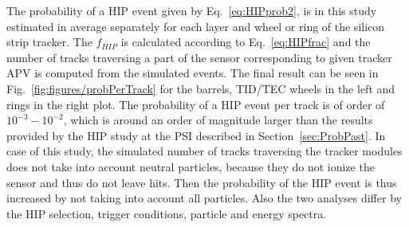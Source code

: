 The probability of a HIP event given by Eq.~\ref{eq:HIPprob2}, is in this study estimated in average separately for each layer and wheel or ring of the silicon strip tracker.  The $f_{HIP}$ is calculated according to Eq.~\ref{eq:HIPfrac} and the number of tracks traversing a part of the sensor corresponding to given tracker APV is computed from the simulated events. The final result can be seen in Fig.~\ref{fig:figures/probPerTrack} for the barrels, TID/TEC wheels in the left and rings in the right plot. The probability of a HIP event per track is of order of $10^{-3}-10^{-2}$, which is around an order of magnitude larger than the results provided by the HIP study at the PSI described in Section~\ref{sec:ProbPast}. In case of this study, the simulated number of tracks traversing the tracker modules does not take into account neutral particles, because they do not ionize the sensor and thus do not leave hits. Then the probability of the HIP event is thus increased by not taking into account all particles. Also the two analyses differ by the HIP selection, trigger conditions, particle and energy spectra.

